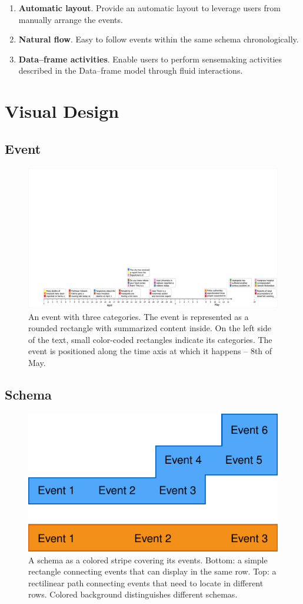 \begin{enumerate}
	\item \textbf{Automatic layout}. Provide an automatic layout to leverage users from manually arrange the events.
	\item \textbf{Natural flow}. Easy to follow events within the same schema chronologically.
	\item \textbf{Data--frame activities}. Enable users to perform sensemaking activities described in the Data--frame model through fluid interactions.
\end{enumerate}

\section{Visual Design}
\subsection{Event}

\begin{figure}[!htb]
	\centering
	\includegraphics[width=.35\columnwidth]{event}
	\caption{An event with three categories. The event is represented as a rounded rectangle with summarized content inside. On the left side of the text, small color-coded rectangles indicate its categories. The event is positioned along the time axis at which it happens -- 8th of May.}
	\label{fig:event}
\end{figure}

\subsection{Schema}

\begin{figure}[!htb]
	\centering
	\includegraphics{schema}
	\caption{A schema as a colored stripe covering its events. Bottom: a simple rectangle connecting events that can display in the same row. Top: a rectilinear path connecting events that need to locate in different rows. Colored background distinguishes different schemas.}
	\label{fig:schema}
\end{figure}

